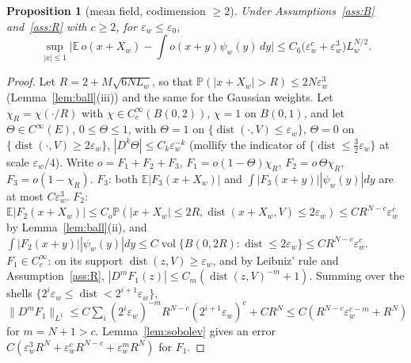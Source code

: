\documentclass[10pt]{article}
\newtheorem{proposition}[theorem]{Proposition}
\theoremstyle{definition}
\theoremstyle{remark}
\newcommand{\E}{\mathbb{E}}
\newcommand{\Prob}{\mathbb{P}}
\newcommand{\dist}{\operatorname{dist}}
\newcommand{\vol}{\operatorname{vol}}
\newcommand{\ew}{\varepsilon_w}
\newcommand{\Lw}{L_w}
\begin{document}
\begin{proposition}[mean field, codimension $\ge2$]\label{prop:field}
Under Assumptions~\ref{ass:B} and~\ref{ass:R} with $c\ge2$, for $\ew\le\varepsilon_0$,
\[
\sup_{|x|\le1}\Big|\E\,o(x+X_w)-\int o(x+y)\psi_w(y)\,dy\Big|\le C_6\big(\ew^{c}+\ew^3\big)\Lw^{N/2}.
\]
\end{proposition}
\begin{proof}
Let $R=2+M\sqrt{6N\Lw}$, so that $\Prob(|x+X_w|>R)\le2N\ew^3$ (Lemma~\ref{lem:ball}(iii)) and the same for the Gaussian
weights. Let $\chi_R=\chi(\cdot/R)$ with $\chi\in C_c^\infty(B(0,2))$, $\chi=1$ on $B(0,1)$, and let
$\Theta\in C^\infty(E)$, $0\le\Theta\le1$, with $\Theta=1$ on $\{\dist(\cdot,V)\le\ew\}$, $\Theta=0$ on
$\{\dist(\cdot,V)\ge2\ew\}$, $|D^k\Theta|\le C_k\ew^{-k}$ (mollify the indicator of $\{\dist\le\frac32\ew\}$ at scale
$\ew/4$). Write $o=F_1+F_2+F_3$, $F_1=o(1-\Theta)\chi_R$, $F_2=o\,\Theta\chi_R$, $F_3=o(1-\chi_R)$.
$F_3$: both $\E|F_3(x+X_w)|$ and $\int|F_3(x+y)||\psi_w(y)|dy$ are at most $C\ew^3$.
$F_2$: $\E|F_2(x+X_w)|\le C_o\Prob(|x+X_w|\le2R,\dist(x+X_w,V)\le2\ew)\le CR^{N-c}\ew^c$ by Lemma~\ref{lem:ball}(ii), and
$\int|F_2(x+y)||\psi_w(y)|dy\le C\vol\{B(0,2R):\dist\le2\ew\}\le CR^{N-c}\ew^c$.
$F_1\in C_c^\infty$: on its support $\dist(z,V)\ge\ew$, and by Leibniz' rule and Assumption~\ref{ass:R},
$|D^mF_1(z)|\le C_m(\dist(z,V)^{-m}+1)$. Summing over the shells $\{2^i\ew\le\dist<2^{i+1}\ew\}$,
$\|D^mF_1\|_{L^1}\le C\sum_i(2^i\ew)^{-m}R^{N-c}(2^{i+1}\ew)^c+CR^N\le C(R^{N-c}\ew^{c-m}+R^N)$ for $m=N+1>c$.
Lemma~\ref{lem:sobolev} gives an error $C(\ew^3R^N+\ew^cR^{N-c}+\ew^mR^N)$ for $F_1$.
\end{proof}
\end{document}
